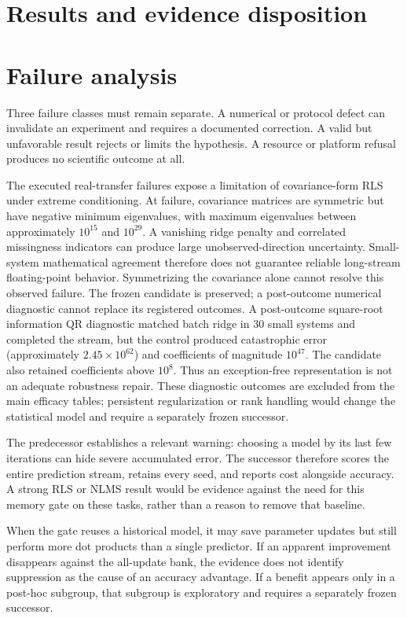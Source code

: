 \documentclass[10pt]{article}
\begin{document}
\section{Results and evidence disposition}



\section{Failure analysis}
Three failure classes must remain separate. A numerical or protocol defect can invalidate an experiment and requires a documented correction. A valid but unfavorable result rejects or limits the hypothesis. A resource or platform refusal produces no scientific outcome at all.

The executed real-transfer failures expose a limitation of covariance-form RLS under extreme conditioning. At failure, covariance matrices are symmetric but have negative minimum eigenvalues, with maximum eigenvalues between approximately $10^{15}$ and $10^{29}$. A vanishing ridge penalty and correlated missingness indicators can produce large unobserved-direction uncertainty. Small-system mathematical agreement therefore does not guarantee reliable long-stream floating-point behavior. Symmetrizing the covariance alone cannot resolve this observed failure. The frozen candidate is preserved; a post-outcome numerical diagnostic cannot replace its registered outcomes. A post-outcome square-root information QR diagnostic matched batch ridge in 30 small systems and completed the stream, but the control produced catastrophic error (approximately $2.45\times10^{62}$) and coefficients of magnitude $10^{47}$. The candidate also retained coefficients above $10^8$. Thus an exception-free representation is not an adequate robustness repair. These diagnostic outcomes are excluded from the main efficacy tables; persistent regularization or rank handling would change the statistical model and require a separately frozen successor.

The predecessor establishes a relevant warning: choosing a model by its last few iterations can hide severe accumulated error. The successor therefore scores the entire prediction stream, retains every seed, and reports cost alongside accuracy. A strong RLS or NLMS result would be evidence against the need for this memory gate on these tasks, rather than a reason to remove that baseline.

When the gate reuses a historical model, it may save parameter updates but still perform more dot products than a single predictor. If an apparent improvement disappears against the all-update bank, the evidence does not identify suppression as the cause of an accuracy advantage. If a benefit appears only in a post-hoc subgroup, that subgroup is exploratory and requires a separately frozen successor.
\end{document}

